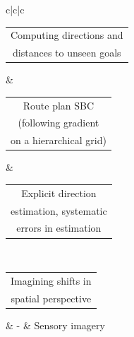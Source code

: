 \begin{table}[h]
{\begin{tabu}{c|c|c}
			\begin{tabular}[c]{@{}c@{}} Computing directions and \\ distances to unseen goals \end{tabular} & \begin{tabular}[c]{@{}c@{}} Route plan SBC \\ (following gradient \\ on a hierarchical grid) \end{tabular} & \begin{tabular}[c]{@{}c@{}} Explicit direction \\ estimation, systematic \\ errors in estimation \end{tabular} \\ \hline
			\begin{tabular}[c]{@{}c@{}} Imagining shifts in \\ spatial perspective \end{tabular} & - & Sensory imagery \\ \hline
			

\end{tabu}}
\end{table}
